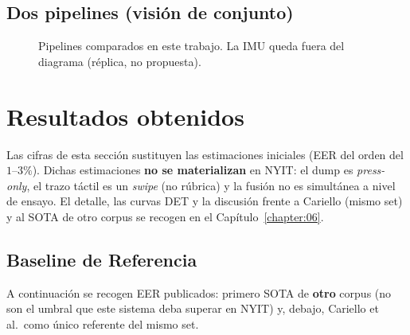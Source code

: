 \subsection{Dos pipelines (visión de conjunto)}

\begin{figure}[H]
\centering
{}
\caption{Pipelines comparados en este trabajo. La IMU queda fuera del diagrama (réplica, no propuesta).}
\label{fig:diagrama_enfoques}
\end{figure}


\section{Resultados obtenidos}\label{sec:resultados_preliminares}

Las cifras de esta sección sustituyen las estimaciones iniciales (EER del orden del $1$--$3\%$). 
Dichas estimaciones \textbf{no se materializan} en NYIT: el dump es \textit{press-only}, el trazo táctil es un
\textit{swipe} (no rúbrica) y la fusión no es simultánea a nivel de ensayo. El detalle, las curvas DET 
y la discusión frente a Cariello (mismo set) y al SOTA de otro corpus se recogen en el Capítulo~\ref{chapter:06}.

\subsection{Baseline de Referencia}

A continuación se recogen EER publicados: primero SOTA de \textbf{otro} corpus (no son el umbral que este
sistema deba superar en NYIT) y, debajo, Cariello et al.\ como único referente del mismo set.

